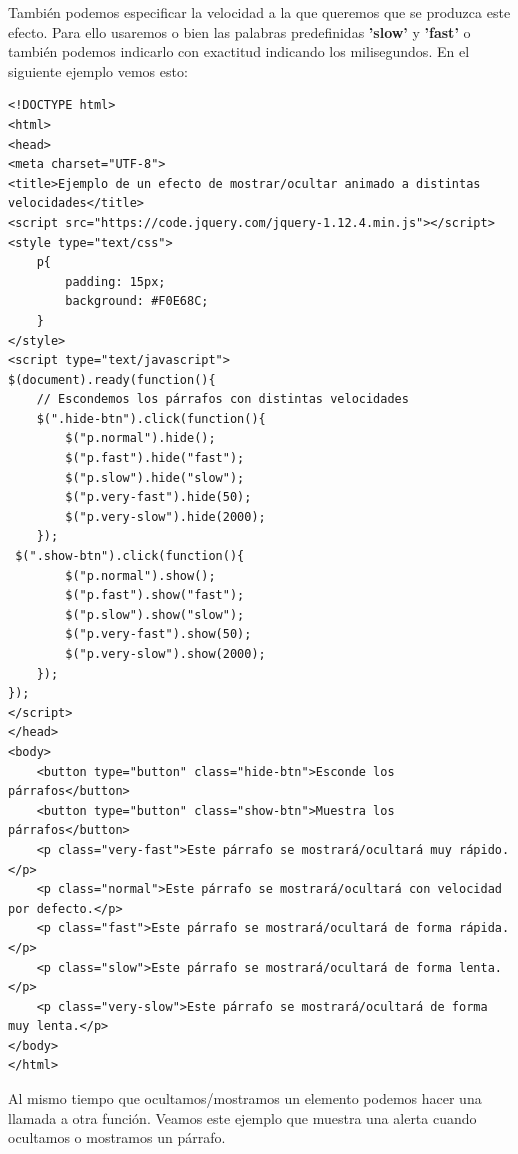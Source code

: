 \documentclass[11pt]{article}
\begin{document}
También podemos especificar la velocidad a la que queremos que se produzca este efecto. Para ello usaremos o bien las palabras predefinidas \textbf{'slow'} y \textbf{'fast'} o también podemos indicarlo con exactitud indicando los milisegundos. En el siguiente ejemplo vemos esto:

\begin{verbatim}
<!DOCTYPE html>
<html>
<head>
<meta charset="UTF-8">
<title>Ejemplo de un efecto de mostrar/ocultar animado a distintas velocidades</title>
<script src="https://code.jquery.com/jquery-1.12.4.min.js"></script>
<style type="text/css">
    p{
        padding: 15px;
        background: #F0E68C;
    }
</style>
<script type="text/javascript">
$(document).ready(function(){
    // Escondemos los párrafos con distintas velocidades
    $(".hide-btn").click(function(){
        $("p.normal").hide();
        $("p.fast").hide("fast");
        $("p.slow").hide("slow");
        $("p.very-fast").hide(50);
        $("p.very-slow").hide(2000);
    });
 $(".show-btn").click(function(){
        $("p.normal").show();
        $("p.fast").show("fast");
        $("p.slow").show("slow");
        $("p.very-fast").show(50);
        $("p.very-slow").show(2000);
    });
});
</script>
</head>
<body>
    <button type="button" class="hide-btn">Esconde los párrafos</button> 
    <button type="button" class="show-btn">Muestra los párrafos</button>
    <p class="very-fast">Este párrafo se mostrará/ocultará muy rápido.</p>
    <p class="normal">Este párrafo se mostrará/ocultará con velocidad por defecto.</p>
    <p class="fast">Este párrafo se mostrará/ocultará de forma rápida.</p>
    <p class="slow">Este párrafo se mostrará/ocultará de forma lenta.</p>
    <p class="very-slow">Este párrafo se mostrará/ocultará de forma muy lenta.</p>
</body>
</html>                                		

\end{verbatim}

Al mismo tiempo que ocultamos/mostramos un elemento podemos hacer una llamada a otra función. Veamos este ejemplo que muestra una alerta cuando ocultamos o mostramos un párrafo.
\end{document}
